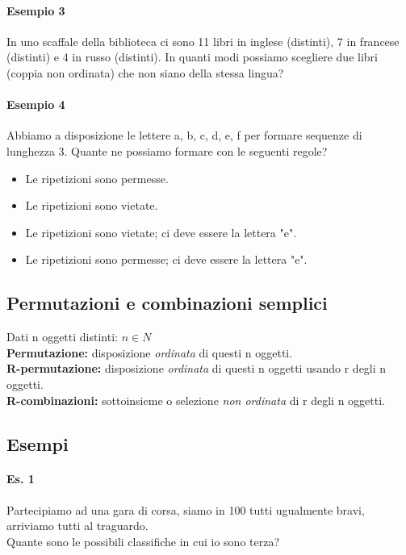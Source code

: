 \paragraph{Esempio 3} In uno scaffale della biblioteca ci sono 11 libri in inglese (distinti),
7 in francese (distinti) e 4 in russo (distinti).
In quanti modi possiamo scegliere due libri (coppia non ordinata) che non siano
della stessa lingua?

\paragraph{Esempio 4} Abbiamo a disposizione le lettere a, b, c, d, e, f per formare sequenze di lunghezza 3.
Quante ne possiamo formare con le seguenti regole?
\begin{itemize}
    \item Le ripetizioni sono permesse.
    \item Le ripetizioni sono vietate.
    \item Le ripetizioni sono vietate; ci deve essere la lettera "e".
    \item Le ripetizioni sono permesse; ci deve essere la lettera "e".
\end{itemize}

\subsection{Permutazioni e combinazioni semplici} 
Dati n oggetti distinti: \(n \in N\) \\
\textbf{Permutazione:} disposizione \emph{ordinata} di questi n oggetti. \\
\textbf{R-permutazione:} disposizione \emph{ordinata} di questi n oggetti usando r degli n oggetti. \\
\textbf{R-combinazioni:} sottoinsieme o selezione \emph{non ordinata} di r degli n oggetti. \\

\subsection{Esempi}
\paragraph{Es. 1} Partecipiamo ad una gara di corsa, siamo in 100 tutti ugualmente bravi,
arriviamo tutti al traguardo. \\ 
Quante sono le possibili classifiche in cui io sono terza?

